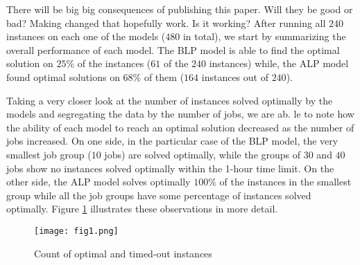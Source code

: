 There will be big big consequences of publishing this paper. Will they be good or bad?
Making changed that hopefully work.
Is it working?
After running all $240$ instances on each one of the models ($480$ in total), we start by summarizing the overall performance of each model. The BLP model is able to find the optimal solution on $25\%$ of the instances ($61$ of the $240$ instances) while, the ALP model found optimal solutions on $68\%$ of them ($164$ instances out of $240$).

Taking a very closer look at the number of instances solved optimally by the models and segregating the data by the number of jobs, we are ab. le to note how the ability of each model to reach an optimal solution decreased as the number of jobs increased. On one side, in the particular case of the BLP model, the very smallest job group ($10$ jobs) are solved optimally, while the groups of $30$ and $40$ jobs show no instances solved optimally within the 1-hour time limit. On the other side, the ALP model solves optimally $100\%$ of the instances in the smallest group while all the job groups have some percentage of instances solved optimally. Figure \ref{fig:f1} illustrates these observations in more detail.
\begin{figure}[h!]
\caption{Count of optimal and timed-out instances}
\label{fig:f1}
\centering
\texttt{[image: fig1.png]}
\end{figure}

